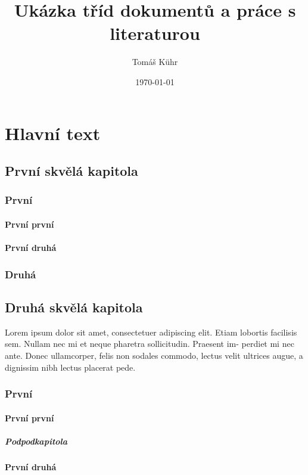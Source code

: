 \documentclass[a4paper, 11pt, openright]{book}
\author{Tomáš Kühr}
\title{Ukázka tříd dokumentů a práce s literaturou}
\date{\today}
\begin{document}
\maketitle
\part{Hlavní text}
\chapter{První skvělá kapitola}
\section{První}
\blindtext
\subsection{První první}
\blindtext
\subsection{První druhá}
\blindtext
\section{Druhá}
\blindtext[5]

\chapter{Druhá skvělá kapitola}
Lorem ipsum \cite{Knuth1986,KnuthA, KnuthB, KnuthC} dolor sit amet, consectetuer adipiscing elit. Etiam lobortis facilisis sem. Nullam nec mi et neque pharetra sollicitudin. Praesent im- perdiet mi nec ante. Donec ullamcorper, felis non sodales commodo, lectus velit ultrices augue, a dignissim nibh lectus placerat pede. 
\section{První}
\blindtext
\subsection{První první}
\blindtext
\subsubsection{Podpodkapitola}
\blindtext
\subsection{První druhá}
\blindtext
\end{document}
